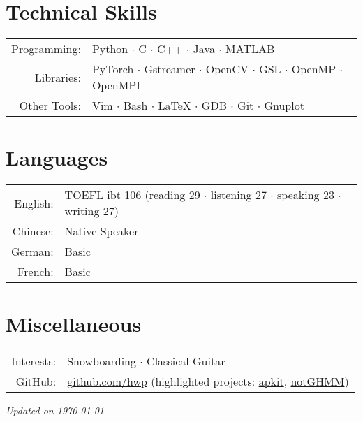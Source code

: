 \documentclass[a4paper,11pt]{article} %
\begin{document}
\section{Technical Skills}

\begin{tabular}{rl}
  Programming: & Python $\cdotp$ C $\cdotp$ C++ $\cdotp$ Java $\cdotp$ MATLAB \\
  Libraries: & PyTorch $\cdotp$ Gstreamer $\cdotp$ OpenCV $\cdotp$ GSL $\cdotp$ OpenMP $\cdotp$ OpenMPI \\
  Other Tools: & Vim $\cdotp$ Bash $\cdotp$ \LaTeX{} $\cdotp$ GDB $\cdotp$ Git $\cdotp$ Gnuplot \\
\end{tabular}


\section{Languages}

\begin{tabular}{rl}
  English: & TOEFL ibt 106 (reading 29 $\cdotp$ listening 27 $\cdotp$ speaking 23 $\cdotp$ writing 27) \\
  Chinese: & Native Speaker \\
  German: & Basic \\
  French: & Basic \\
\end{tabular}

\section{Miscellaneous}

\begin{tabular}{rl}
  Interests: & Snowboarding $\cdotp$ Classical Guitar \\
  GitHub: & \href{https://github.com/hwp}{github.com/hwp} (highlighted projects: \href{https://github.com/hwp/apkit}{apkit}, \href{https://github.com/hwp/notGHMM}{notGHMM}) \\
\end{tabular}



\vfill
\centering \footnotesize \itshape Updated on \today
\end{document}
